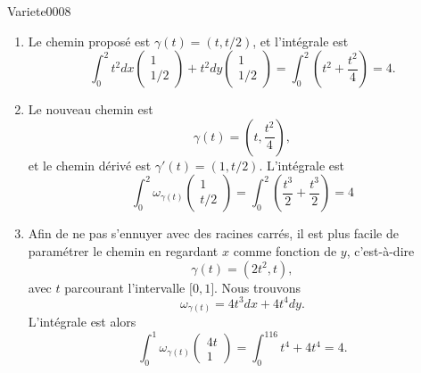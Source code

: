 
\begin{corrige}{Variete0008}

	\begin{enumerate}

		\item
			Le chemin proposé est $\gamma(t)=(t,t/2)$, et l'intégrale est
			\begin{equation}
				\int_0^2t^2dx\begin{pmatrix}
					1	\\ 
					1/2	
				\end{pmatrix}+t^2dy\begin{pmatrix}
					1	\\ 
					1/2	
				\end{pmatrix}=
				\int_0^2\left( t^2+\frac{ t^2 }{ 4 } \right)=4.
			\end{equation}
		\item
			Le nouveau chemin est
			\begin{equation}
				\gamma(t)=(t,\frac{ t^2 }{ 4 }),
			\end{equation}
			et le chemin dérivé est $\gamma'(t)=(1,t/2)$. L'intégrale est
			\begin{equation}
				\int_0^2\omega_{\gamma(t)}\begin{pmatrix}
					1	\\ 
					t/2	
				\end{pmatrix}=
				\int_0^2(\frac{ t^3 }{ 2 }+\frac{ t^3 }{ 2 })=4
			\end{equation}
			
		\item
			Afin de ne pas s'ennuyer avec des racines carrés, il est plus facile de paramétrer le chemin en regardant $x$ comme fonction de $y$, c'est-à-dire
			\begin{equation}
				\gamma(t)=(2t^2,t),
			\end{equation}
			avec $t$ parcourant l'intervalle $\mathopen[ 0 , 1 \mathclose]$. Nous trouvons
			\begin{equation}
				\omega_{\gamma(t)}=4t^3dx+4t^4dy.
			\end{equation}
			L'intégrale est alors
			\begin{equation}
				\int_0^1\omega_{\gamma(t)}\begin{pmatrix}
					4t	\\ 
					1	
				\end{pmatrix}=
				\int_0^116t^4+4t^4=4.
			\end{equation}
		

\end{enumerate}
\end{corrige}

